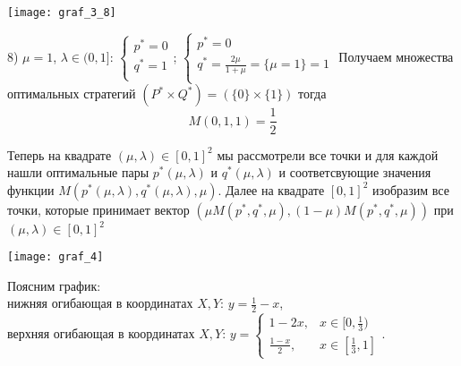 \begin{center}
\texttt{[image: graf\_3\_8]}
\end{center}
8) $\mu = 1$, $\lambda \in (0, 1] $: 
$\begin{cases}
p^{*}=0 \\
q^{*}=1 \\
\end{cases}$;
$\begin{cases}
p^{*}=0 \\
q^{*}=\frac{2\mu}{1+\mu}=\{\mu=1\}=1 \\
\end{cases}$
\hfill \break
Получаем множества оптимальных стратегий 
$(P^{*} \times Q^{*}) =(\{0\} \times \{1\})$ тогда
$$M(0, 1, 1)=\frac{1}{2}$$
\vspace{40mm}

Теперь на квадрате $(\mu,\lambda)\in[0, 1]^{2}$ мы рассмотрели все точки и для каждой нашли оптимальные пары $p^{*}(\mu, \lambda)$
и $q^{*}(\mu, \lambda)$ и соответсвующие значения функции $M(p^{*}(\mu, \lambda),q^{*}(\mu, \lambda),\mu)$. Далее на квадрате
$[0, 1]^{2}$ изобразим все точки, которые принимает вектор $(\mu M(p^{*},q^{*},\mu), (1-\mu) M(p^{*},q^{*},\mu))$ при
$(\mu, \lambda)\in[0, 1]^{2}$

\begin{center}
\texttt{[image: graf\_4]}
\end{center}

Поясним график: \\
нижняя огибающая в координатах $X,Y$: $y=\frac{1}{2}-x$, \\
верхняя огибающая в координатах $X,Y$: $y=
\begin{cases}
1-2x, & x \in [0, \frac{1}{3}) \\
\frac{1-x}{2}, & x \in [\frac{1}{3}, 1]
\end{cases}.
$
